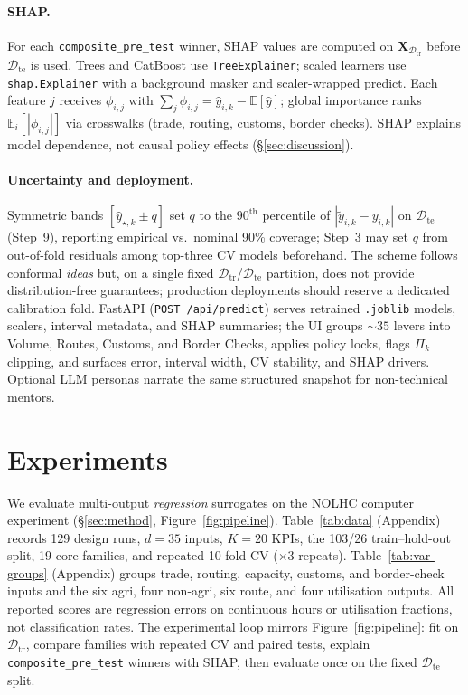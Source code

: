 \documentclass[12pt,twocolumn,a4paper]{article}
\theoremstyle{plain}
\theoremstyle{definition}
\theoremstyle{remark}
\newcommand{\train}{\mathcal{D}_{\mathrm{tr}}}
\newcommand{\test}{\mathcal{D}_{\mathrm{te}}}
\begin{document}
\paragraph{SHAP.}
For each \texttt{composite\_pre\_test} winner, SHAP values \citep{lundberg2017shap} are computed on $\mathbf{X}_{\train}$ before $\test$ is used.
Trees and CatBoost use \texttt{TreeExplainer}; scaled learners use \texttt{shap.Explainer} with a background masker and scaler-wrapped predict.
Each feature $j$ receives $\phi_{i,j}$ with $\sum_j \phi_{i,j} = \hat{y}_{i,k} - \mathbb{E}[\hat{y}]$; global importance ranks $\mathbb{E}_i[|\phi_{i,j}|]$ via crosswalks (trade, routing, customs, border checks).
SHAP explains model dependence, not causal policy effects (\S\ref{sec:discussion}).

\paragraph{Uncertainty and deployment.}
\label{sec:method-deploy}
Symmetric bands $[\hat{y}_{\star,k} \pm q]$ set $q$ to the $90^{\mathrm{th}}$ percentile of $|\tilde{y}_{i,k}-y_{i,k}|$ on $\test$ (Step~9), reporting empirical vs.\ nominal 90\% coverage; Step~3 may set $q$ from out-of-fold residuals among top-three CV models beforehand.
The scheme follows conformal \emph{ideas} \citep{vovk2005algorithmic,angelopoulos2023conformal,romano2019cqr} but, on a single fixed $\train$/$\test$ partition, does not provide distribution-free guarantees; production deployments should reserve a dedicated calibration fold.
FastAPI (\texttt{POST /api/predict}) serves retrained \texttt{.joblib} models, scalers, interval metadata, and SHAP summaries; the UI groups ${\sim}35$ levers into Volume, Routes, Customs, and Border Checks, applies policy locks, flags $\Pi_k$ clipping, and surfaces error, interval width, CV stability, and SHAP drivers.
Optional LLM personas narrate the same structured snapshot for non-technical mentors.

\section{Experiments}
\label{sec:experiments}

We evaluate multi-output \emph{regression} surrogates on the NOLHC computer experiment (\S\ref{sec:method}, Figure~\ref{fig:pipeline}).
Table~\ref{tab:data} (Appendix) records 129 design runs, $d{=}35$ inputs, $K{=}20$ KPIs, the 103/26 train--hold-out split, 19 core families, and repeated 10-fold CV ($\times 3$ repeats).
Table~\ref{tab:var-groups} (Appendix) groups trade, routing, capacity, customs, and border-check inputs and the six agri, four non-agri, six route, and four utilisation outputs.
All reported scores are regression errors on continuous hours or utilisation fractions, not classification rates.
The experimental loop mirrors Figure~\ref{fig:pipeline}: fit on $\train$, compare families with repeated CV and paired tests, explain \texttt{composite\_pre\_test} winners with SHAP, then evaluate once on the fixed $\test$ split.
\end{document}
